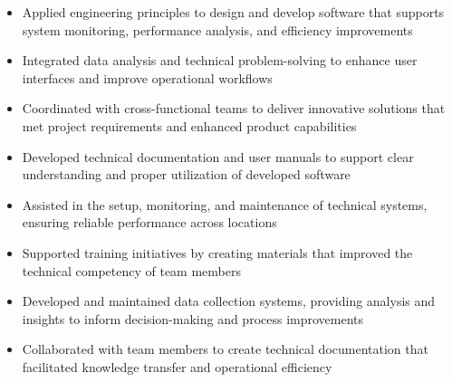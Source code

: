 \par\smallskip
\noindent
\begin{minipage}{20cm}
  \begin{minipage}{9.75cm}
    \begin{itemize}
      \item Applied engineering principles to design and develop software that supports system monitoring, performance analysis, and efficiency improvements
      \item Integrated data analysis and technical problem-solving to enhance user interfaces and improve operational workflows
    \end{itemize}
  \end{minipage}
  \hfill
  \begin{minipage}{9.75cm}
    \begin{itemize}
      \item Coordinated with cross-functional teams to deliver innovative solutions that met project requirements and enhanced product capabilities
      \item Developed technical documentation and user manuals to support clear understanding and proper utilization of developed software
    \end{itemize}
  \end{minipage}
\end{minipage}
\par\smallskip
\divider

\par\smallskip
\noindent
\begin{minipage}{20cm}
  \begin{minipage}{9.75cm}
    \begin{itemize}
      \item Assisted in the setup, monitoring, and maintenance of technical systems, ensuring reliable performance across locations
      \item Supported training initiatives by creating materials that improved the technical competency of team members
    \end{itemize}
  \end{minipage}
  \hfill
  \begin{minipage}{9.75cm}
    \begin{itemize}
      \item Developed and maintained data collection systems, providing analysis and insights to inform decision-making and process improvements
      \item Collaborated with team members to create technical documentation that facilitated knowledge transfer and operational efficiency
    \end{itemize}
  \end{minipage}
\end{minipage}

